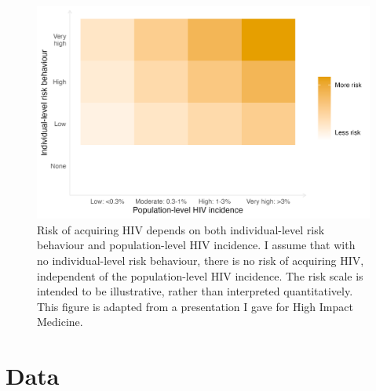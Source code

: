 \documentclass[a4paper, nobind]{templates/ociamthesis}
\begin{document}
\begin{figure}

{\centering \includegraphics[width=0.95\linewidth]{figures/multi-agyw/risk-grid} 

}

\caption{Risk of acquiring HIV depends on both individual-level risk behaviour and population-level HIV incidence. I assume that with no individual-level risk behaviour, there is no risk of acquiring HIV, independent of the population-level HIV incidence. The risk scale is intended to be illustrative, rather than interpreted quantitatively. This figure is adapted from a presentation I gave for High Impact Medicine.}\label{fig:risk-grid}
\end{figure}

\hypertarget{data}{%
\section{Data}\label{data}}
\end{document}
